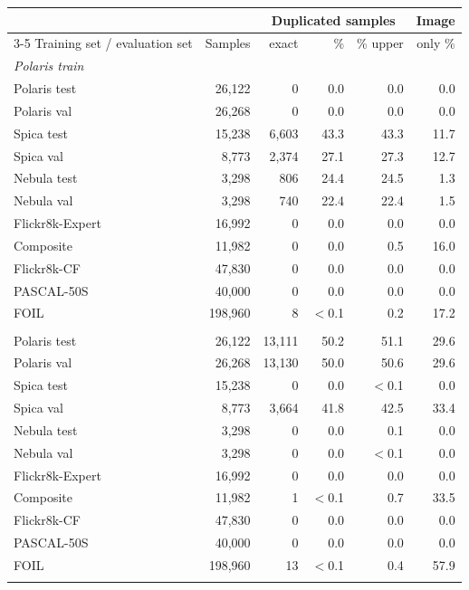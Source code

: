 \begin{tabular}{lrrrrr}
\toprule
& & \multicolumn{3}{c}{Duplicated samples} & Image \\
\cmidrule(lr){3-5}
Training set / evaluation set & Samples & exact & \% & \% upper & only \% \\
\midrule
\multicolumn{6}{l}{\emph{Polaris train}} \\
\quad Polaris test & 26,122 & 0 & 0.0 & 0.0 & 0.0 \\
\quad Polaris val & 26,268 & 0 & 0.0 & 0.0 & 0.0 \\
\quad Spica test & 15,238 & 6,603 & 43.3 & 43.3 & 11.7 \\
\quad Spica val & 8,773 & 2,374 & 27.1 & 27.3 & 12.7 \\
\quad Nebula test & 3,298 & 806 & 24.4 & 24.5 & 1.3 \\
\quad Nebula val & 3,298 & 740 & 22.4 & 22.4 & 1.5 \\
\quad Flickr8k-Expert & 16,992 & 0 & 0.0 & 0.0 & 0.0 \\
\quad Composite & 11,982 & 0 & 0.0 & 0.5 & 16.0 \\
\quad Flickr8k-CF & 47,830 & 0 & 0.0 & 0.0 & 0.0 \\
\quad PASCAL-50S & 40,000 & 0 & 0.0 & 0.0 & 0.0 \\
\quad FOIL & 198,960 & 8 & $<$0.1 & 0.2 & 17.2 \\
\addlinespace
\multicolumn{6}{l}{\emph{Nebula train}} \\
\quad Polaris test & 26,122 & 13,111 & 50.2 & 51.1 & 29.6 \\
\quad Polaris val & 26,268 & 13,130 & 50.0 & 50.6 & 29.6 \\
\quad Spica test & 15,238 & 0 & 0.0 & $<$0.1 & 0.0 \\
\quad Spica val & 8,773 & 3,664 & 41.8 & 42.5 & 33.4 \\
\quad Nebula test & 3,298 & 0 & 0.0 & 0.1 & 0.0 \\
\quad Nebula val & 3,298 & 0 & 0.0 & $<$0.1 & 0.0 \\
\quad Flickr8k-Expert & 16,992 & 0 & 0.0 & 0.0 & 0.0 \\
\quad Composite & 11,982 & 1 & $<$0.1 & 0.7 & 33.5 \\
\quad Flickr8k-CF & 47,830 & 0 & 0.0 & 0.0 & 0.0 \\
\quad PASCAL-50S & 40,000 & 0 & 0.0 & 0.0 & 0.0 \\
\quad FOIL & 198,960 & 13 & $<$0.1 & 0.4 & 57.9 \\
\addlinespace
\multicolumn{6}{l}{\emph{Spica train}} \\

\end{tabular}
